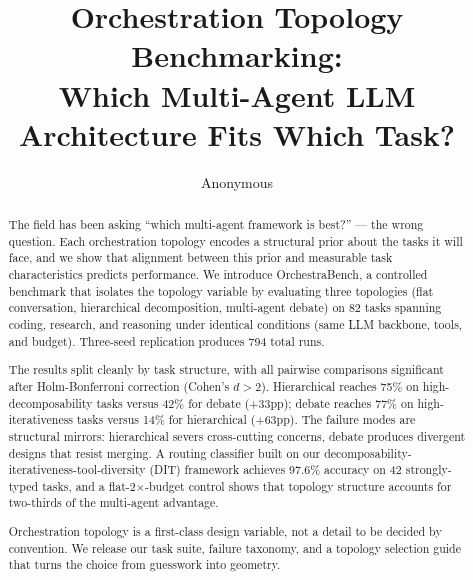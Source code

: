 \documentclass{article}
\title{Orchestration Topology Benchmarking:\\Which Multi-Agent LLM Architecture Fits Which Task?}
\author{Anonymous}
\begin{document}
\maketitle

\begin{abstract}
The field has been asking ``which multi-agent framework is best?'' --- the wrong question. Each orchestration topology encodes a structural prior about the tasks it will face, and we show that alignment between this prior and measurable task characteristics predicts performance. We introduce OrchestraBench, a controlled benchmark that isolates the topology variable by evaluating three topologies (flat conversation, hierarchical decomposition, multi-agent debate) on 82 tasks spanning coding, research, and reasoning under identical conditions (same LLM backbone, tools, and budget). Three-seed replication produces 794 total runs.

The results split cleanly by task structure, with all pairwise comparisons significant after Holm-Bonferroni correction (Cohen's $d > 2$). Hierarchical reaches 75\% on high-decomposability tasks versus 42\% for debate (+33pp); debate reaches 77\% on high-iterativeness tasks versus 14\% for hierarchical (+63pp). The failure modes are structural mirrors: hierarchical severs cross-cutting concerns, debate produces divergent designs that resist merging. A routing classifier built on our decomposability-iterativeness-tool-diversity (DIT) framework achieves 97.6\% accuracy on 42 strongly-typed tasks, and a flat-2$\times$-budget control shows that topology structure accounts for two-thirds of the multi-agent advantage.

Orchestration topology is a first-class design variable, not a detail to be decided by convention. We release our task suite, failure taxonomy, and a topology selection guide that turns the choice from guesswork into geometry.
\end{abstract}









\appendix




\end{document}
